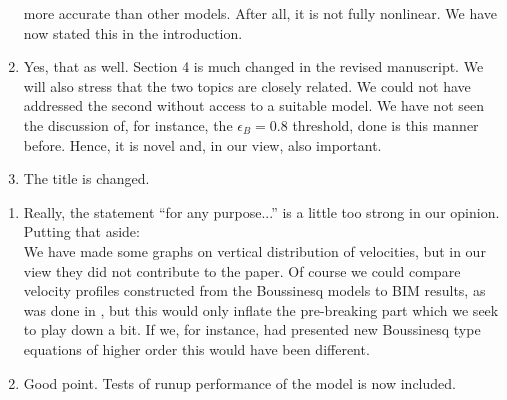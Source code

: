 \documentclass[11pt]{article}
\begin{document}
\begin{enumerate}
more accurate than other models. After all, it is not fully nonlinear.  We have now stated this  in the introduction.
\item Yes, that as well. Section 4 is much changed in the revised manuscript. We will also stress that the two
      topics are closely related. We could not have addressed the second without access to a suitable model.
      We have not seen the discussion of, for instance, the $\epsilon_B=0.8$ threshold, done is this manner before.
      Hence, it is novel and, in our view, also important.      
\item The title is changed.
\end{enumerate}
\begin{enumerate}
\item Really, the statement ``for any purpose...'' is a little too strong in our opinion. Putting that aside:\\
We have made some graphs on vertical distribution of velocities, but in our view they did not contribute to the paper.
Of course we could compare velocity profiles constructed from the Boussinesq models to BIM results, as was done in   \cite{wei1995fully}, but
this would only inflate the pre-breaking part which we seek to play down a bit. If we, for instance, had presented new Boussinesq type 
equations of higher 
order this  would have been different.
\item Good point. Tests of runup performance of the model is now included.   
\end{enumerate}
\end{document}

